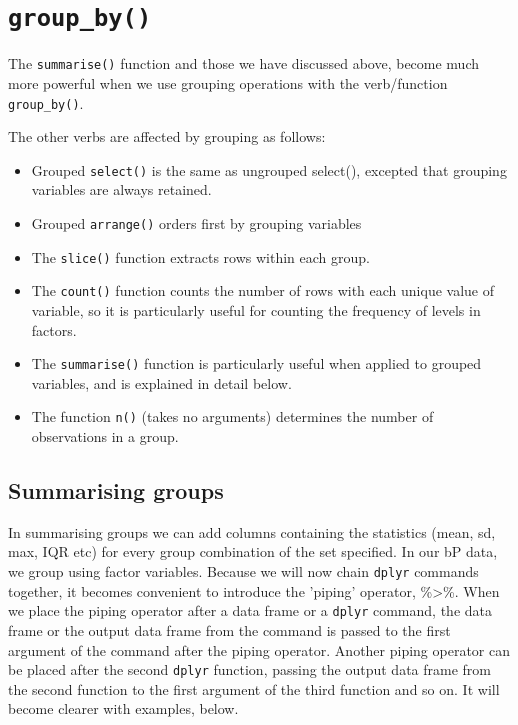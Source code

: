 \documentclass[titlepage]{book}\usepackage{knitr}
\begin{document}


\section{\texttt{group\_by()}}

The \texttt{summarise()} function and those we have discussed above, become much more powerful when we use grouping operations with the verb/function \texttt{group\_by()}.

The other verbs are affected by grouping as follows:
\begin{itemize}
\item {Grouped \texttt{select()} is the same as ungrouped select(), excepted that grouping variables are always retained.}

\item {Grouped \texttt{arrange()} orders first by grouping variables}

\item {The \texttt{slice()} function extracts rows within each group.}

\item {The \texttt{count()} function counts the number of rows with each unique value of variable, so it is  particularly useful for counting the frequency of levels in factors.}

\item {The \texttt{summarise()} function is particularly useful when applied to grouped variables, and is explained in detail below.}

\item {The function \texttt{n()} (takes no arguments) determines the number of observations in a group.}

\end{itemize}

\subsection{Summarising groups}
In summarising groups we can add columns containing the statistics (mean, sd, max, IQR etc)
for every group combination of the set specified. In our bP data, we group using factor variables.
Because we will now chain \texttt{dplyr} commands together, it becomes convenient to introduce the 'piping' operator, \%>\%. When we place the piping operator after a data frame or a \texttt{dplyr} command, the data frame or the output data frame from the command is passed to the first argument of the command after the piping operator. Another piping operator can be placed after the second \texttt{dplyr} function, passing the output data frame from the second function to the first argument of the third function and so on.  It will become clearer with examples, below.
\end{document}

